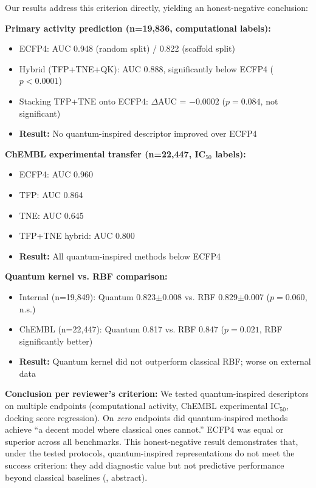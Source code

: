 \documentclass[11pt]{article}
\begin{document}
Our results address this criterion directly, yielding an honest-negative conclusion:

\textbf{Primary activity prediction (n=19,836, computational labels):}
\begin{itemize}[leftmargin=1.6em]
\item ECFP4: AUC 0.948 (random split) / 0.822 (scaffold split)
\item Hybrid (TFP+TNE+QK): AUC 0.888, significantly below ECFP4 ($p < 0.0001$)
\item Stacking TFP+TNE onto ECFP4: $\Delta$AUC = $-0.0002$ ($p=0.084$, not significant)
\item \textbf{Result:} No quantum-inspired descriptor improved over ECFP4
\end{itemize}

\textbf{ChEMBL experimental transfer (n=22,447, IC$_{50}$ labels):}
\begin{itemize}[leftmargin=1.6em]
\item ECFP4: AUC 0.960
\item TFP: AUC 0.864
\item TNE: AUC 0.645
\item TFP+TNE hybrid: AUC 0.800
\item \textbf{Result:} All quantum-inspired methods below ECFP4
\end{itemize}

\textbf{Quantum kernel vs. RBF comparison:}
\begin{itemize}[leftmargin=1.6em]
\item Internal (n=19,849): Quantum 0.823$\pm$0.008 vs. RBF 0.829$\pm$0.007 ($p=0.060$, n.s.)
\item ChEMBL (n=22,447): Quantum 0.817 vs. RBF 0.847 ($p=0.021$, RBF significantly better)
\item \textbf{Result:} Quantum kernel did not outperform classical RBF; worse on external data
\end{itemize}

\textbf{Conclusion per reviewer's criterion:} We tested quantum-inspired descriptors on 
multiple endpoints (computational activity, ChEMBL experimental IC$_{50}$, docking score 
regression). On \textit{zero} endpoints did quantum-inspired methods achieve ``a decent model 
where classical ones cannot.'' ECFP4 was equal or superior across all benchmarks. This 
honest-negative result demonstrates that, under the tested protocols, quantum-inspired 
representations do not meet the success criterion: they add diagnostic value but not 
predictive performance beyond classical baselines (, abstract).
\end{document}

